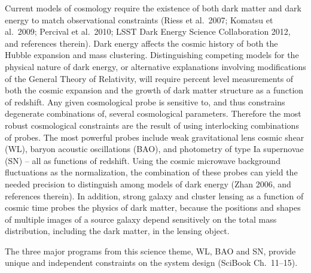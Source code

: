 \documentclass{emulateapj}
\begin{document}
Current models of cosmology require the existence of both dark matter and dark
energy to match observational constraints (Riess et al.~2007; Komatsu et al.~2009; 
Percival et al.~2010; LSST Dark Energy Science Collaboration 2012, and
references therein). Dark energy affects the cosmic history of both the Hubble expansion 
and mass clustering. Distinguishing competing models for the physical
nature of dark energy, or alternative explanations involving
modifications of the General Theory of Relativity, will require 
percent level measurements of both the cosmic expansion and the growth 
of dark matter structure as a function of redshift.  Any given
cosmological probe is sensitive to, and thus constrains degenerate
combinations of, several cosmological parameters.  Therefore the most robust
cosmological constraints are the result of using interlocking combinations
of probes. The most powerful probes include weak gravitational lens cosmic shear (WL), baryon 
acoustic oscillations (BAO), and photometry of type Ia supernovae (SN) -- all as functions of 
redshift. Using the cosmic microwave background fluctuations as the normalization, the 
combination of these probes can yield the needed precision to distinguish among models of dark 
energy (Zhan 2006, and references therein). In addition, strong galaxy 
and cluster lensing as a function of cosmic time probes the physics of dark matter,
because the positions and shapes of multiple images of a source galaxy 
depend sensitively on the total mass distribution, including the dark matter,
in the lensing object.

The three major programs from this science theme, WL, BAO and SN,  provide unique and 
independent constraints on the system design (SciBook Ch.~11--15). 
\end{document}
